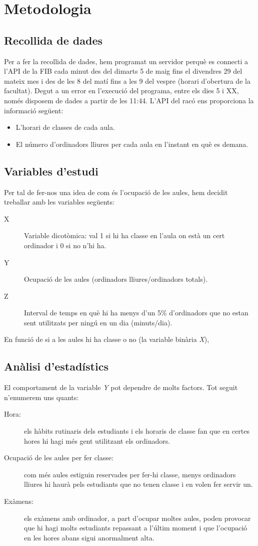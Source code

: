 \section{Metodologia}

\subsection{Recollida de dades}
Per a fer la recollida de dades, hem programat un servidor perquè es connecti a l'API de la FIB cada minut des del dimarts 5 de maig fins el divendres 29 del mateix mes i des de les 8 del matí fins a les 9 del vespre (horari d'obertura de la facultat). Degut a un error en l'execució del programa, entre els dies 5 i XX, només disposem de dades a partir de les  11:44.
L'API del racó ens proporciona la informació següent:
\begin{itemize}
	\item L'horari de classes de cada aula.
	\item El número d'ordinadors lliures per cada aula en l'instant en què es demana.
\end{itemize}

\subsection{Variables d'estudi}
Per tal de fer-nos una idea de com és l'ocupació de les aules, hem decidit treballar amb les variables següents:
\begin{description}
	\item[X] Variable dicotòmica: val 1 si hi ha classe en l'aula on està un cert ordinador i 0 si no n'hi ha.
	\item[Y] Ocupació de les aules (ordinadors lliures/ordinadors totals).
	\item[Z] Interval de temps en què hi ha menys d'un 5\% d'ordinadors que no estan sent utilitzats per ningú en un dia (minuts/dia).
\end{description}

En funció de si a les aules hi ha classe o no (la variable binària \emph{X}), 
 
\subsection{Anàlisi d'estadístics}
El comportament de la variable \emph{Y} pot dependre de molts factors. Tot seguit n'enumerem uns quants:
\begin{description}
	\item[Hora:] els hàbits rutinaris dels estudiants i els horaris de classe fan que en certes hores hi hagi més gent utilitzant els ordinadors.
	\item[Ocupació de les aules per fer classe:] com més aules estiguin reservades per fer-hi classe, menys ordinadors lliures hi haurà pels estudiants que no tenen classe i en volen fer servir un.
	\item[Exàmens:] els exàmens amb ordinador, a part d'ocupar moltes aules, poden provocar que hi hagi molts estudiants repassant a l'últim moment i que l'ocupació en les hores abans sigui anormalment alta.
\end{description}



